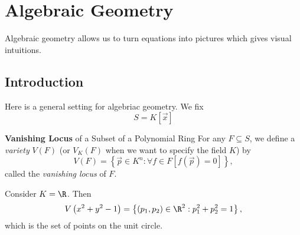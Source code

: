 \documentclass[co439]{subfiles}
\begin{document}
    \section{Algebraic Geometry}

    Algebraic geometry allows us to turn equations into pictures which gives visual intuitions.

    \subsection{Introduction}

    Here is a general setting for algebriac geometry. We fix
    \begin{equation*}
        S = K\left[ \vec{x} \right]
    \end{equation*}

    \begin{definition}{\textbf{Vanishing Locus} of a Subset of a Polynomial Ring}
        For any $F\subseteq S$, we define a \emph{variety} $V\left( F \right)$ (or $V_K\left( F \right)$ when we want to specify the field $K$) by
        \begin{equation*}
            V\left( F \right) = \left\lbrace \vec{p}\in K^n: \forall f\in F\left[ f\left( \vec{p} \right) = 0 \right] \right\rbrace,
        \end{equation*}
        called the \emph{vanishing locus} of $F$.
    \end{definition}
    
    \begin{example}{}
        Consider $K=\R$. Then 
        \begin{equation*}
            V\left( x^{2}+y^{2}-1 \right) = \left\lbrace \left( p_1,p_2 \right)\in\R^{2}: p_1^{2}+p_2^{2}=1 \right\rbrace,
        \end{equation*}
        which is the set of points on the unit circle.
    \end{example}
    
    \rruleline
    
\end{document}
